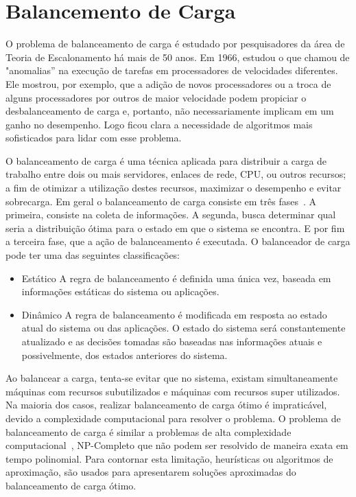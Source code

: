 \section{Balancemento de Carga}\label{intro:carga}

O problema de balanceamento de carga é estudado por pesquisadores da área de Teoria de Escalonamento há mais de 50 anos. Em 1966, \citep{graham66} estudou o que chamou de "anomalias'' na execução de tarefas em processadores de velocidades diferentes. Ele mostrou, por exemplo, que a adição de novos processadores ou a troca de alguns processadores por outros de maior velocidade podem propiciar o desbalanceamento de carga e, portanto, não necessariamente implicam em um ganho no desempenho. Logo ficou clara a necessidade de algoritmos mais sofisticados para lidar com esse problema.  

O balanceamento de carga é uma técnica aplicada para distribuir a carga de trabalho entre dois ou mais servidores, enlaces de rede, CPU, ou outros recursos; a fim de otimizar a utilização destes recursos, maximizar o desempenho e evitar sobrecarga. Em geral o balanceamento de carga consiste em três fases~\citep{carga}. A primeira, consiste na coleta de informações. A segunda, busca determinar qual seria a distribuição ótima para o estado em que o sistema se encontra. E por fim a terceira fase, que a ação de balanceamento é executada. O balanceador de carga pode ter uma das seguintes classificações:

\begin{itemize}
\item Estático A regra de balanceamento é definida uma única vez, baseada em informações estáticas do sistema ou aplicações.

\item Dinâmico A regra de balanceamento é modificada em resposta ao estado atual do sistema ou das aplicações. O estado do sistema será constantemente atualizado e as decisões tomadas são baseadas nas informações atuais e possivelmente, dos estados anteriores do sistema.
\end{itemize}

Ao balancear a carga, tenta-se evitar que no sistema, existam simultaneamente máquinas com recursos subutilizados e máquinas com recursos super utilizados. Na maioria dos casos, realizar balanceamento de carga ótimo é impraticável, devido a complexidade computacional para resolver o problema. O problema de balanceamento de carga  é similar a problemas de alta complexidade computacional~\citep{virtual}, NP-Completo que não podem ser resolvido de maneira exata em tempo polinomial. Para contornar esta limitação, heurísticas ou algoritmos de aproximação, são usados para apresentarem soluções aproximadas do balanceamento de carga ótimo.


